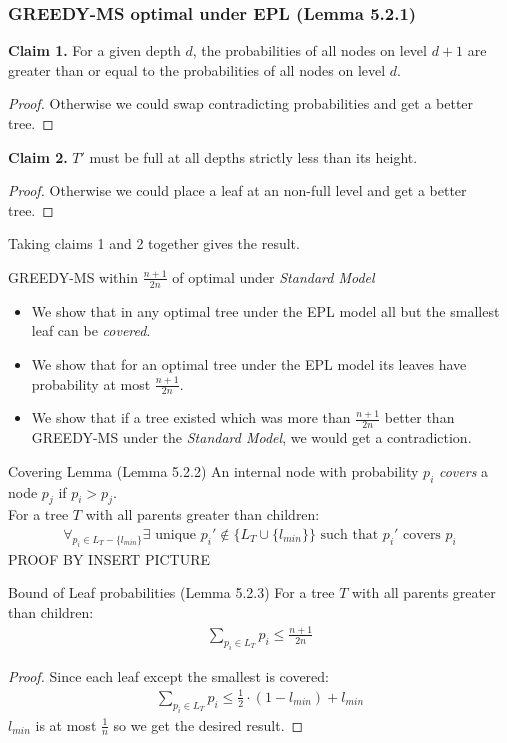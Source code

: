 \documentclass[]{beamer}
\theoremstyle{plain}
\begin{document}
\begin{frame}\frametitle{GREEDY-MS optimal under EPL (Lemma 5.2.1)}
\textbf{Claim 1.}\label{Claim-EPL}
For a given depth $d$, the probabilities of all nodes on level $d+1$ are greater than or equal to the probabilities of all nodes on level $d$.
\begin{proof}
Otherwise we could swap contradicting probabilities and get a better tree.
\end{proof}

\noindent \textbf{Claim 2.}\label{Claim-EPL2}
$T'$ must be full at all depths strictly less than its height.
\begin{proof}
Otherwise we could place a leaf at an non-full level and get a better tree.
\end{proof}

Taking claims 1 and 2 together gives the result.
\end{frame}

\begin{frame}{GREEDY-MS within $\frac{n+1}{2n}$ of optimal under \textit{Standard Model} }
\begin{itemize}
\item[1.] We show that in any optimal tree under the EPL model all but the smallest leaf can be \textit{covered}.
\item[2.] We show that for an optimal tree under the EPL model its leaves have probability at most $\frac{n+1}{2n}$.
\item[3.] We show that if a tree existed which was more than  $\frac{n+1}{2n}$ better than GREEDY-MS under the \textit{Standard Model}, we would get a contradiction.
\end{itemize}
\end{frame}

\begin{frame}{Covering Lemma (Lemma 5.2.2)}
An internal node with probability $p_i$ \textit{covers} a node $p_j$ if $p_i > p_j$.\\
For a tree $T$ with all parents greater than children:
\begin{align*}
\forall_{p_i \in L_T-\{l_{min}\}} \exists \text{ unique } p_i' \notin \{L_T \cup \{l_{min}\}\} \text{ such that } p_i' \text{ covers } p_i
\end{align*}
PROOF BY INSERT PICTURE

\end{frame}

\begin{frame}{Bound of Leaf probabilities (Lemma 5.2.3)}
For a tree $T$ with all parents greater than children:
\begin{align*}
\sum_{p_i \in L_T} p_i \leq \frac{n+1}{2n}
\end{align*}
\begin{proof}
Since each leaf except the smallest is covered:
\begin{align*}
\sum_{p_i \in L_T} p_i \leq \frac{1}{2} \cdot (1-l_{min}) + l_{min}
\end{align*}
$l_{min}$ is at most $\frac{1}{n}$ so we get the desired result.
\end{proof}
\end{frame}
\end{document}
